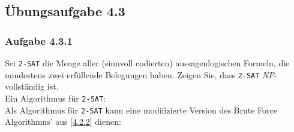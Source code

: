 \documentclass{article}
\begin{document}
\subsection{Übungsaufgabe 4.3}
\begin{flushright}
\begin{Large}
[~~~~\string| ~~6~]
\end{Large}
\end{flushright}
\subsubsection{Aufgabe 4.3.1}
Sei \texttt{2-SAT} die Menge aller (sinnvoll codierten) aussagenlogischen Formeln, die mindestens zwei erfüllende Belegungen haben.
Zeigen Sie, dass \texttt{2-SAT} \textit{NP}-vollständig ist.
\vspace{1cm}\-\\
Ein Algorithmus für \texttt{2-SAT}:\\
Als Algorithmus für \texttt{2-SAT} kann eine modifizierte Version des Brute Force Algorithmus' aus \ref{4.2.2} dienen:\\
\end{document}
